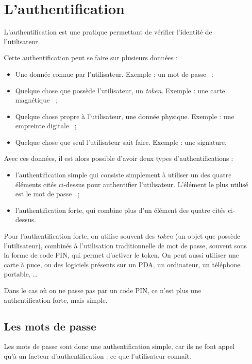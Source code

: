 \section{L'authentification}
L'authentification est une pratique permettant de vérifier
l'identité de l'utilisateur.

Cette authentification peut se faire sur plusieurs données : 
\begin{itemize}
  \item Une donnée connue par l'utilisateur. Exemple : un mot de
passe ~;
  \item Quelque chose que possède l'utilisateur, un \emph{token}.
Exemple : une carte magnétique ~;
  \item Quelque chose propre à l'utilisateur, une donnée physique.
Exemple : une empreinte digitale ~;
  \item Quelque chose que seul l'utilisateur sait faire. Exemple :
une signature.
\end{itemize}

Avec ces données, il est alors possible d'avoir deux types
d'authentifications : 
\begin{itemize}
  \item l'authentification simple qui consiste simplement à
utiliser un des quatre éléments cités ci-dessus pour authentifier
l'utilisateur. L'élément le plus utilisé est le mot de passe ~;
  \item l'authentification forte, qui combine plus d'un élément
des quatre cités ci-dessus.
\end{itemize}

Pour l'authentification forte, on utilise souvent des
\emph{token} (un objet que possède l'utilisateur), 
combinés à l'utilisation traditionnelle de mot de passe, souvent
sous la forme de code PIN, qui permet d'activer le token.
On peut aussi utiliser une carte à puce, ou des logiciels présents
sur un PDA, un ordinateur, un téléphone portable, …

Dans le cas où on ne passe pas par un code PIN, ce n'est plus une
authentification forte, mais simple.

\subsection{Les mots de passe}
Les mots de passe sont donc une authentification simple, car ils
ne font appel qu'à un facteur d'authentification : ce que
l'utilisateur connaît. 

